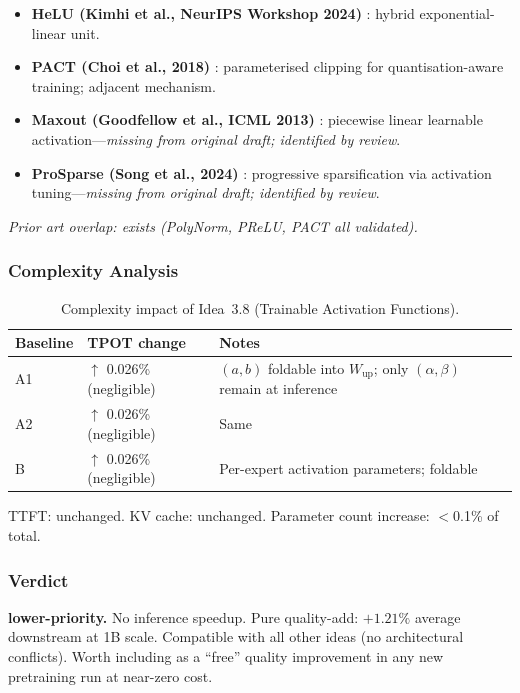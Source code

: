 \documentclass[11pt]{article}
\begin{document}
\begin{itemize}
  \item \textbf{HeLU (Kimhi et al., NeurIPS Workshop 2024)} \cite{KimhiEtAl2024}: hybrid exponential-linear unit.

  \item \textbf{PACT (Choi et al., 2018)} \cite{ChoiEtAl2018}: parameterised clipping for quantisation-aware training; adjacent mechanism.

  \item \textbf{Maxout (Goodfellow et al., ICML 2013)} \cite{GoodfellowEtAl2013Maxout}: piecewise linear learnable activation---\emph{missing from original draft; identified by review}.

  \item \textbf{ProSparse (Song et al., 2024)} \cite{SongEtAl2024ProSparse}: progressive sparsification via activation tuning---\emph{missing from original draft; identified by review}.
\end{itemize}

\noindent
\emph{Prior art overlap: exists (PolyNorm, PReLU, PACT all validated).}

\subsubsection*{Complexity Analysis}

\begin{table}[h]
\centering
\caption{Complexity impact of Idea~3.8 (Trainable Activation Functions).}
\label{tab:complexity-3-8}
\begin{tabular}{llp{7cm}}
\toprule
\textbf{Baseline} & \textbf{TPOT change} & \textbf{Notes} \\
\midrule
A1 & $\uparrow$ 0.026\% (negligible) & $(a,b)$ foldable into $W_\text{up}$; only $(\alpha,\beta)$ remain at inference \\
A2 & $\uparrow$ 0.026\% (negligible) & Same \\
B  & $\uparrow$ 0.026\% (negligible) & Per-expert activation parameters; foldable \\
\bottomrule
\end{tabular}
\end{table}

\noindent
TTFT: unchanged.
KV cache: unchanged.
Parameter count increase: $<$0.1\% of total.

\subsubsection*{Verdict}
\textbf{lower-priority.}
No inference speedup.
Pure quality-add: $+1.21\%$ average downstream at 1B scale.
Compatible with all other ideas (no architectural conflicts).
Worth including as a ``free'' quality improvement in any new pretraining run at near-zero cost.
\end{document}
